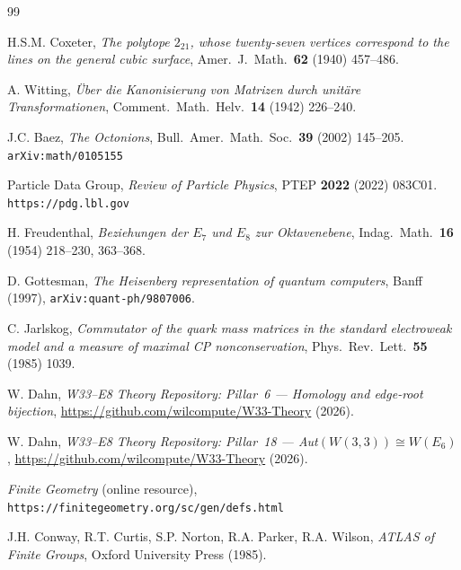 \documentclass[11pt,a4paper]{article}
\theoremstyle{definition}
\theoremstyle{remark}
\begin{document}
\begin{thebibliography}{99}

H.S.M. Coxeter,
\textit{The polytope $2_{21}$, whose twenty-seven vertices correspond to the
lines on the general cubic surface},
Amer.\ J.\ Math.\ \textbf{62} (1940) 457--486.

A. Witting,
\textit{\"Uber die Kanonisierung von Matrizen durch unit\"are Transformationen},
Comment.\ Math.\ Helv.\ \textbf{14} (1942) 226--240.

J.C. Baez,
\textit{The Octonions},
Bull.\ Amer.\ Math.\ Soc.\ \textbf{39} (2002) 145--205.
\texttt{arXiv:math/0105155}

Particle Data Group,
\textit{Review of Particle Physics},
PTEP \textbf{2022} (2022) 083C01.
\texttt{https://pdg.lbl.gov}

H. Freudenthal,
\textit{Beziehungen der $E_7$ und $E_8$ zur Oktavenebene},
Indag.\ Math.\ \textbf{16} (1954) 218--230, 363--368.

D. Gottesman,
\textit{The Heisenberg representation of quantum computers},
Banff (1997), \texttt{arXiv:quant-ph/9807006}.

C. Jarlskog,
\textit{Commutator of the quark mass matrices in the standard electroweak model and a
measure of maximal CP nonconservation},
Phys.\ Rev.\ Lett.\ \textbf{55} (1985) 1039.

W. Dahn,
\textit{W33--E8 Theory Repository: Pillar~6 --- Homology and edge-root bijection},
\url{https://github.com/wilcompute/W33-Theory} (2026).

W. Dahn,
\textit{W33--E8 Theory Repository: Pillar~18 --- Aut$(W(3{,}3)) \cong W(E_6)$},
\url{https://github.com/wilcompute/W33-Theory} (2026).

\textit{Finite Geometry} (online resource),
\texttt{https://finitegeometry.org/sc/gen/defs.html}

J.H. Conway, R.T. Curtis, S.P. Norton, R.A. Parker, R.A. Wilson,
\textit{ATLAS of Finite Groups},
Oxford University Press (1985).

\end{thebibliography}
\end{document}
